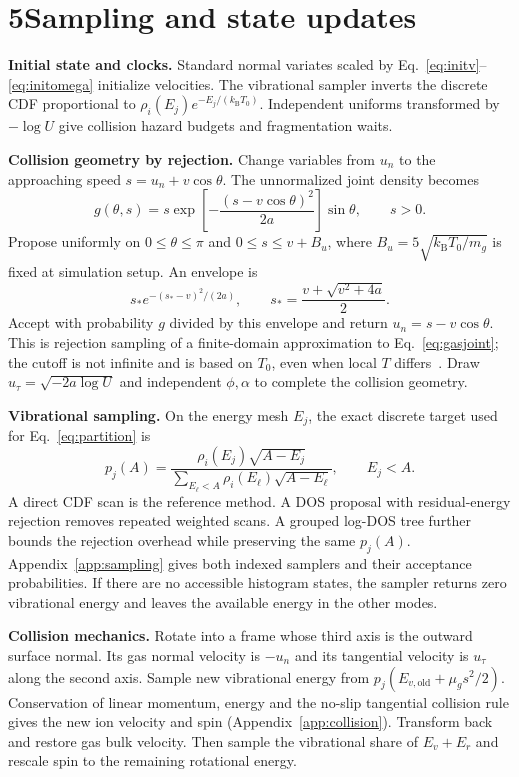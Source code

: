 \documentclass[10pt,a4paper]{article}
\newcommand{\kb}{k_{\mathrm B}}
\newcommand{\overview}[2]{\section*{#1\quad #2}\addcontentsline{toc}{section}{#1 #2}}
\begin{document}
\clearpage
\overview{5}{Sampling and state updates}
\textbf{Initial state and clocks.} Standard normal variates scaled by
Eq.~\eqref{eq:initv}--\eqref{eq:initomega} initialize velocities. The
vibrational sampler inverts the discrete CDF proportional to
$\rho_i(E_j)e^{-E_j/(\kb T_0)}$. Independent uniforms transformed by $-\log U$
give collision hazard budgets and fragmentation waits.

\textbf{Collision geometry by rejection.} Change variables from $u_n$ to the
approaching speed $s=u_n+v\cos\theta$. The unnormalized joint density becomes
\[
 g(\theta,s)=s\exp\!\left[-\frac{(s-v\cos\theta)^2}{2a}\right]\sin\theta,
 \qquad s>0.
\]
Propose uniformly on $0\leq\theta\leq\pi$ and $0\leq s\leq v+B_u$, where
$B_u=5\sqrt{\kb T_0/m_g}$ is fixed at simulation setup. An envelope is
\[
 s_*e^{-(s_*-v)^2/(2a)},\qquad
 s_*=\frac{v+\sqrt{v^2+4a}}2.
\]
Accept with probability $g$ divided by this envelope and return
$u_n=s-v\cos\theta$. This is rejection sampling of a finite-domain
approximation to Eq.~\eqref{eq:gasjoint}; the cutoff is not infinite and
is based on $T_0$, even when local $T$ differs~\cite{notebook}.
Draw $u_\tau=\sqrt{-2a\log U}$ and independent $\phi,\alpha$ to complete
the collision geometry.

\textbf{Vibrational sampling.} On the energy mesh $E_j$, the exact discrete
target used for Eq.~\eqref{eq:partition} is
\[
 p_j(A)=\frac{\rho_i(E_j)\sqrt{A-E_j}}
 {\sum_{E_\ell<A}\rho_i(E_\ell)\sqrt{A-E_\ell}},\qquad E_j<A.
\]
A direct CDF scan is the reference method. A DOS proposal with residual-energy
rejection removes repeated weighted scans. A grouped log-DOS tree further
bounds the rejection overhead while preserving the same $p_j(A)$.
Appendix~\ref{app:sampling} gives both indexed samplers and their acceptance
probabilities. If there are no accessible histogram states, the sampler returns
zero vibrational energy and leaves the available energy in the other modes.

\textbf{Collision mechanics.} Rotate into a frame whose third axis is the
outward surface normal. Its gas normal velocity is $-u_n$ and its tangential
velocity is $u_\tau$ along the second axis. Sample new vibrational energy from
$p_j(E_{v,\mathrm{old}}+\mu_gs^2/2)$. Conservation of linear momentum, energy
and the no-slip tangential collision rule gives the new ion velocity and spin
(Appendix~\ref{app:collision}). Transform back and restore gas bulk velocity.
Then sample the vibrational share of $E_v+E_r$ and rescale spin to the
remaining rotational energy.
\end{document}
